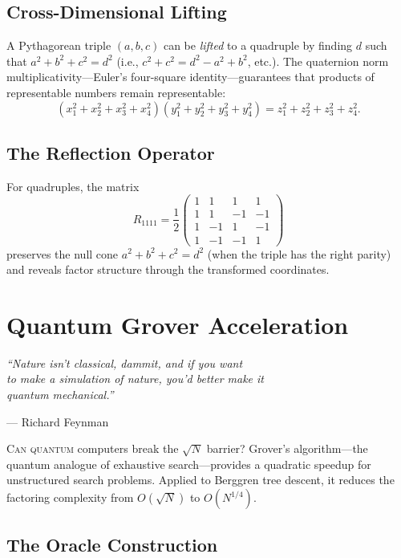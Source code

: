 \documentclass[11pt,twoside,openright]{book}
\theoremstyle{definition}
\begin{document}
\section{Cross-Dimensional Lifting}

A Pythagorean triple $(a,b,c)$ can be \emph{lifted} to a quadruple by
finding $d$ such that $a^2 + b^2 + c^2 = d^2$ (i.e., $c^2 + c^2 = d^2 - a^2 + b^2$, etc.).
The quaternion norm multiplicativity---Euler's four-square identity---guarantees
that products of representable numbers remain representable:
\[
(x_1^2 + x_2^2 + x_3^2 + x_4^2)(y_1^2 + y_2^2 + y_3^2 + y_4^2)
= z_1^2 + z_2^2 + z_3^2 + z_4^2.
\]

\section{The Reflection Operator}

For quadruples, the matrix
\[
R_{1111} = \frac{1}{2}\begin{pmatrix} 1&1&1&1\\1&1&-1&-1\\1&-1&1&-1\\1&-1&-1&1\end{pmatrix}
\]
preserves the null cone $a^2+b^2+c^2 = d^2$ (when the triple has the
right parity) and reveals factor structure through the transformed
coordinates.

\chapter{Quantum Grover Acceleration}
\label{ch:quantum}

\epigraph{\itshape ``Nature isn't classical, dammit, and if you want\\
to make a simulation of nature, you'd better make it\\
quantum mechanical.''}
{--- Richard Feynman}

\lettrine[lines=3]{C}{an quantum} computers break the $\sqrt{N}$ barrier?
Grover's algorithm---the quantum analogue of exhaustive search---provides
a quadratic speedup for unstructured search problems. Applied to
Berggren tree descent, it reduces the factoring complexity from
$O(\sqrt{N})$ to $O(N^{1/4})$.

\section{The Oracle Construction}
\end{document}
